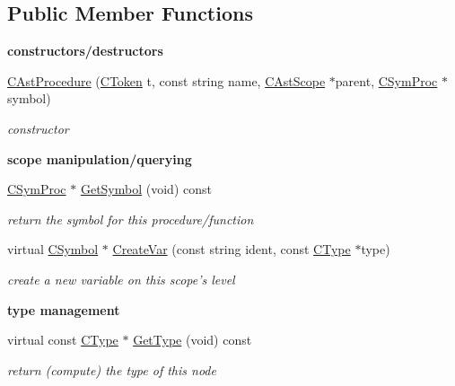 \subsection*{Public Member Functions}
\begin{Indent}{\bf constructors/destructors}\par
\begin{DoxyCompactItemize}
\item 
\hyperlink{classCAstProcedure_a9cb338e9a71b2f47f7f46ed5cf1eb264}{C\-Ast\-Procedure} (\hyperlink{classCToken}{C\-Token} t, const string name, \hyperlink{classCAstScope}{C\-Ast\-Scope} $\ast$parent, \hyperlink{classCSymProc}{C\-Sym\-Proc} $\ast$symbol)
\begin{DoxyCompactList}\small\item\em constructor \end{DoxyCompactList}\end{DoxyCompactItemize}
\end{Indent}
\begin{Indent}{\bf scope manipulation/querying}\par
\begin{DoxyCompactItemize}
\item 
\hyperlink{classCSymProc}{C\-Sym\-Proc} $\ast$ \hyperlink{classCAstProcedure_ac44e89463cac0f6488e5521e000efd49}{Get\-Symbol} (void) const 
\begin{DoxyCompactList}\small\item\em return the symbol for this procedure/function \end{DoxyCompactList}\item 
\hypertarget{classCAstProcedure_ad1c78859aa1852a1e7559bc2bf6922db}{virtual \hyperlink{classCSymbol}{C\-Symbol} $\ast$ \hyperlink{classCAstProcedure_ad1c78859aa1852a1e7559bc2bf6922db}{Create\-Var} (const string ident, const \hyperlink{classCType}{C\-Type} $\ast$type)}\label{classCAstProcedure_ad1c78859aa1852a1e7559bc2bf6922db}

\begin{DoxyCompactList}\small\item\em create a new variable on this scope's level \end{DoxyCompactList}\end{DoxyCompactItemize}
\end{Indent}
\begin{Indent}{\bf type management}\par
\begin{DoxyCompactItemize}
\item 
\hypertarget{classCAstProcedure_a3f674d90de0ec004d772e3b5406d113d}{virtual const \hyperlink{classCType}{C\-Type} $\ast$ \hyperlink{classCAstProcedure_a3f674d90de0ec004d772e3b5406d113d}{Get\-Type} (void) const }\label{classCAstProcedure_a3f674d90de0ec004d772e3b5406d113d}

\begin{DoxyCompactList}\small\item\em return (compute) the type of this node \end{DoxyCompactList}\end{DoxyCompactItemize}
\end{Indent}
